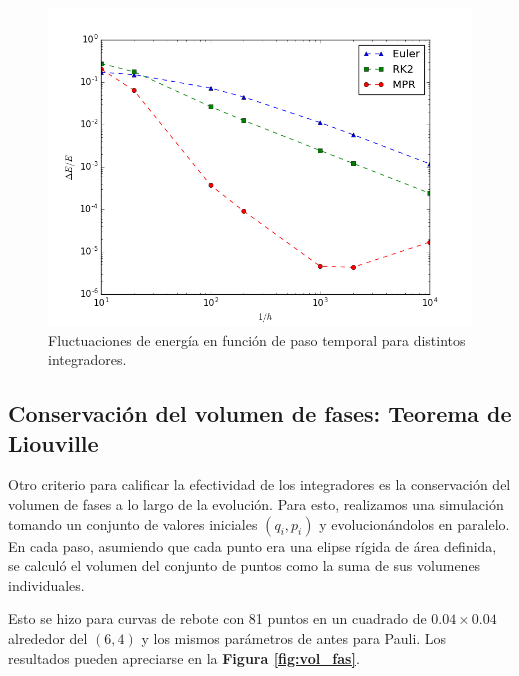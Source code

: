 \documentclass[twoside, 12pt]{article}
\begin{document}
\begin{figure}[h]
	\centering
	\includegraphics[trim = 0mm 0mm 15mm 10mm, clip, width=0.6\columnwidth]{fluct_vs_h.png}
	\caption{Fluctuaciones de energía en función de paso temporal para distintos integradores.}
	\label{fig:flucvsh}
\end{figure}

\subsection{Conservación del volumen de fases: Teorema de Liouville}

Otro criterio para calificar la efectividad de los integradores es la conservación del volumen de fases a lo largo de la evolución.
Para esto, realizamos una simulación tomando un conjunto de valores iniciales $(q_i, p_i)$ y evolucionándolos en paralelo.
En cada paso, asumiendo que cada punto era una elipse rígida de área definida, se calculó el volumen del conjunto de puntos como la suma de sus volumenes individuales.

Esto se hizo para curvas de rebote con 81 puntos en un cuadrado de $0.04\times0.04$ alrededor del $(6, 4)$ y los mismos parámetros de antes para Pauli.
Los resultados pueden apreciarse en la \textbf{Figura \ref{fig:vol_fas}}.
\end{document}
